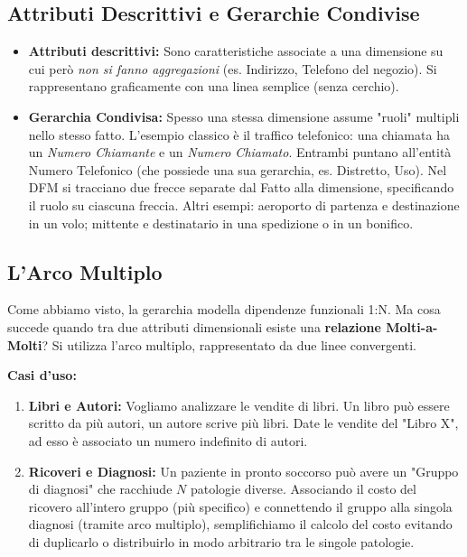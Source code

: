 \subsection{Attributi Descrittivi e Gerarchie Condivise}
\begin{itemize}
    \item \textbf{Attributi descrittivi:} Sono caratteristiche associate a una dimensione su cui però \textit{non si fanno aggregazioni} (es. Indirizzo, Telefono del negozio). Si rappresentano graficamente con una linea semplice (senza cerchio).
    \item \textbf{Gerarchia Condivisa:} Spesso una stessa dimensione assume "ruoli" multipli nello stesso fatto. L'esempio classico è il traffico telefonico: una chiamata ha un \textit{Numero Chiamante} e un \textit{Numero Chiamato}. Entrambi puntano all'entità Numero Telefonico (che possiede una sua gerarchia, es. Distretto, Uso). Nel DFM si tracciano due frecce separate dal Fatto alla dimensione, specificando il ruolo su ciascuna freccia. Altri esempi: aeroporto di partenza e destinazione in un volo; mittente e destinatario in una spedizione o in un bonifico.
\end{itemize}

\subsection{L'Arco Multiplo}
Come abbiamo visto, la gerarchia modella dipendenze funzionali 1:N. Ma cosa succede quando tra due attributi dimensionali esiste una \textbf{relazione Molti-a-Molti}?
Si utilizza l'arco multiplo, rappresentato da due linee convergenti.

\textbf{Casi d'uso:}
\begin{enumerate}
    \item \textbf{Libri e Autori:} Vogliamo analizzare le vendite di libri. Un libro può essere scritto da più autori, un autore scrive più libri. Date le vendite del "Libro X", ad esso è associato un numero indefinito di autori.
    \item \textbf{Ricoveri e Diagnosi:} Un paziente in pronto soccorso può avere un "Gruppo di diagnosi" che racchiude $N$ patologie diverse. Associando il costo del ricovero all'intero gruppo (più specifico) e connettendo il gruppo alla singola diagnosi (tramite arco multiplo), semplifichiamo il calcolo del costo evitando di duplicarlo o distribuirlo in modo arbitrario tra le singole patologie.
\end{enumerate}

